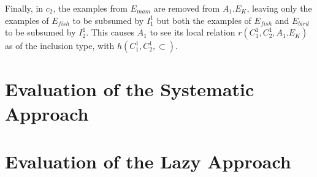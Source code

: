 Finally, in $c_{2}$, the examples from $E_{mam}$ are removed from $A_{1}.E_{K}$, leaving only the examples of $E_{fish}$ to be subsumed by $I_{1}^{1}$ but both the examples of $E_{fish}$ and $E_{bird}$ to be subsumed by $I_{2}^{1}$. This causes $A_{1}$ to see its local relation $r(C_{1}^{1},C_{2}^{1},A_{1}.E_{K})$ as of the inclusion type, with $h(C_{1}^{1},C_{2}^{1}, \subset)$.

\section{Evaluation of the Systematic Approach}

\section{Evaluation of the Lazy Approach}